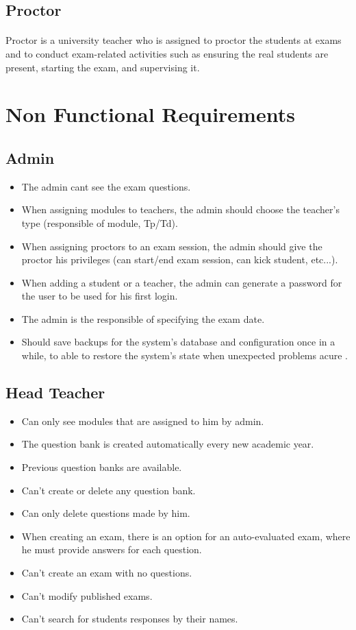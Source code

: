 \documentclass[]{uc2pfecaneva}
\begin{document}
\raggedright\subsection{Proctor}
\paragraph{}
	Proctor is a university teacher who is assigned to proctor the students at exams and to conduct exam-related activities such as ensuring the real students are present, starting the exam, and supervising it.

\raggedright\section{Non Functional Requirements}
\raggedright\subsection{Admin}
\begin{itemize}
\item The admin cant see the exam questions.
\item When assigning modules to teachers, the admin should choose the teacher’s type (responsible of module, Tp/Td).
\item When assigning proctors to an exam session, the admin should give the proctor his privileges (can start/end exam session, can kick student, etc...).
\item When adding a student or a teacher, the admin can generate a password for the user to be used for his first login.
\item The admin is the responsible of specifying the exam date.
\item Should save backups for the system’s database and configuration once in a while, to able to restore the system’s state when  unexpected problems acure .

\end{itemize}

\raggedright\subsection{Head Teacher}
\begin{itemize}
	\item Can only see modules that are assigned to him by admin.
	\item The question bank is created automatically every new academic year.
	\item Previous question banks are available.
	\item Can’t create or delete any question bank.
	\item Can only delete questions made by him.
	\item When creating an exam, there is an option for an auto-evaluated exam, where he must provide answers for each question.
	\item Can’t create an exam with no questions.
	\item Can’t modify published exams.
	\item Can’t search for students responses by their names.
\end{itemize}
\end{document}
